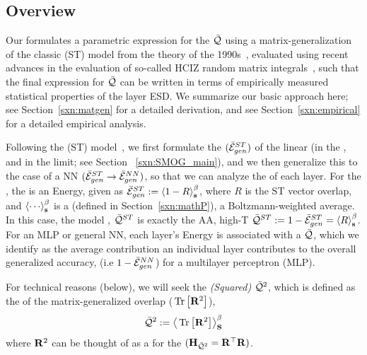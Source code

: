 \subsection{\SETOL Overview}
\label{sxn:setol_overview}


Our \SETOL formulates a parametric expression for the \LayerQuality $\bar{\mathcal{Q}}$ using a matrix-generalization of the classic \StudentTeacher (ST)
model from the \SMOG theory of the 1990s~\cite{SST92,STS90}, evaluated using
recent advances in the evaluation of so-called HCIZ random matrix integrals~\cite{potters_bouchaud_2020,Tanaka2007, Tanaka2008},
such that the final expression for $\bar{\mathcal{Q}}$ can be written in terms of empirically measured statistical properties of the layer ESD.
We summarize our basic approach here; see Section~\ref{sxn:matgen} for a detailed derivation, and see Section~\ref{sxn:empirical} for a detailed empirical analysis.

Following the \StudentTeacher (ST) model~\cite{SST92}, 
we first formulate the \GeneralizationError $(\bar{\mathcal{E}}^{ST}_{gen})$ of the linear \Perceptron (in the \emph{\AnnealedApproximation},
and in the \emph{\HighTemperature} limit; see Section ~\ref{sxn:SMOG_main}), and 
we then generalize this to the case of a NN $(\bar{\mathcal{E}}^{ST}_{gen}\rightarrow\bar{\mathcal{E}}^{NN}_{gen})$, so that we can analyze the \Quality of each layer.
For the \Perceptron, the \GeneralizationError is an Energy, given as $\bar{\mathcal{E}}^{ST}_{gen}:=\left\langle 1-R \right\rangle_{\mathbf s}^{\beta}$, where $R$ is the ST vector overlap,
and $\THRMAVG{\cdots}$ is a \emph{\ThermalAverage} (defined in Section~\ref{sxn:mathP}),
a Boltzmann-weighted average.
In this case, the model \Quality, $\bar{\mathcal{Q}}^{ST}$ is exactly the AA, high-T \AverageGeneralizationAccuracy 
{}
$\bar{\mathcal{Q}}^{ST}:=1-\bar{\mathcal{E}}^{ST}_{gen}=\left\langle R \right\rangle_{\mathbf s}^{\beta}$.
For an MLP or general NN, each layer's Energy is associated with a
\LayerQuality $\bar{\mathcal{Q}}$, which we identify as the average contribution an
individual layer contributes to the overall generalized accuracy,
(i.e $1-\bar{\mathcal{E}}^{NN}_{gen}$) for a multilayer perceptron (MLP).

For technical reasons (below), we will seek the
\emph{\LayerQuality (Squared)} $\bar{\mathcal{Q}}^{2}$, which is defined as the \ThermalAverage
of the matrix-generalized overlap ($\mbox{}\operatorname{Tr}\left[\mathbf{R}^{2}\right]$),
\begin{align}
  \label{eqn:QT}
  \bar{\mathcal{Q}}^{2} :=   \left\langle \mbox{}\operatorname{Tr}\left[\mathbf{R}^{2}\right] \right\rangle_{\mathbf S}^{\beta}
\end{align}
where $\mathbf{R}^{2}$ can be thought of as a \Hamiltonian for the \QualitySquared  $(\mathbf{H}_{\bar{\mathcal{Q}}^{2}}=\mathbf{R}^{\top}\mathbf{R})$.


